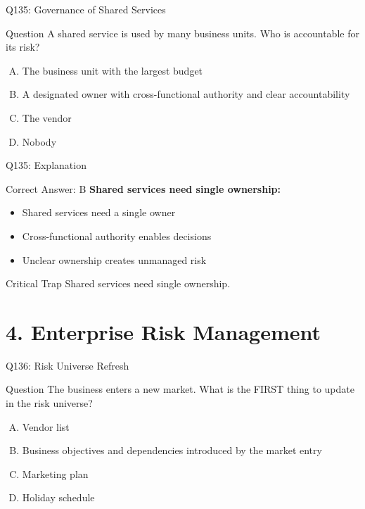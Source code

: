 \documentclass{beamer}
\begin{document}
	\begin{frame}{Q135: Governance of Shared Services}
		\begin{block}{Question}
			A shared service is used by many business units. Who is accountable for its risk?
		\end{block}
		\begin{enumerate}[(A)]
			\item The business unit with the largest budget
			\item A designated owner with cross-functional authority and clear accountability
			\item The vendor
			\item Nobody
		\end{enumerate}
	\end{frame}
	
	\begin{frame}{Q135: Explanation}
		\begin{block}{Correct Answer: B}
			\textbf{Shared services need single ownership:}
			\begin{itemize}
				\item Shared services need a single owner
				\item Cross-functional authority enables decisions
				\item Unclear ownership creates unmanaged risk
			\end{itemize}
		\end{block}
		\begin{alertblock}{Critical Trap}
			Shared services need single ownership.
		\end{alertblock}
	\end{frame}
	
	\section{4. Enterprise Risk Management}
	
	\begin{frame}{Q136: Risk Universe Refresh}
		\begin{block}{Question}
			The business enters a new market. What is the FIRST thing to update in the risk universe?
		\end{block}
		\begin{enumerate}[(A)]
			\item Vendor list
			\item Business objectives and dependencies introduced by the market entry
			\item Marketing plan
			\item Holiday schedule
		\end{enumerate}
	\end{frame}
	
\end{document}
